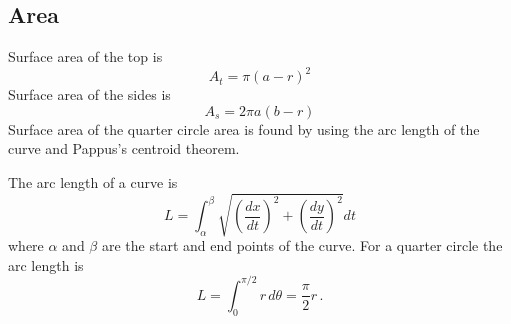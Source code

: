 \documentclass[a4paper,10pt]{article}
\numberwithin{equation}{section}
\begin{document}
\subsection{Area}
Surface area of the top is
\begin{equation}
A_{t} = \pi \left( a-r \right)^2
\end{equation}
Surface area of the sides is
\begin{equation}
A_{s} = 2\pi a (b-r)
\end{equation}
Surface area of the quarter circle area is found by using the arc length of the curve and Pappus's centroid theorem.

The arc length of a curve is
\begin{equation}
L = \int_\alpha^\beta \sqrt{\left( \frac{dx}{dt} \right)^2 + \left( \frac{dy}{dt} \right)^2} dt
\end{equation}
where \(\alpha\) and \(\beta\) are the start and end points of the curve.
For a quarter circle the arc length is
\begin{equation}
L = \int_0^{\pi/2} r\, d\theta = \frac{\pi}{2} r\, .
\end{equation}
\end{document}
